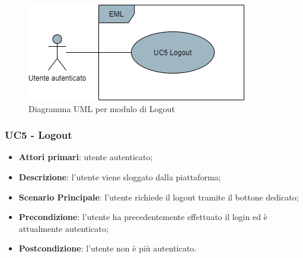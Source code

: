 \begin{figure}[H]
\centering
\includegraphics[scale=0.6]{res/UseCase/Immagini/Logout}
\caption{Diagramma UML per modulo di Logout}
\end{figure}

\subsubsection{UC5 - Logout}
\begin{itemize}
\item \textbf{Attori primari}: utente autenticato;
\item \textbf{Descrizione}: l'utente viene sloggato dalla piattaforma;
\item \textbf{Scenario Principale}: l'utente richiede il logout tramite il bottone dedicato;
\item \textbf{Precondizione}: l'utente ha precedentemente effettuato il login ed è attualmente autenticato;
\item \textbf{Postcondizione}: l'utente non è più autenticato.
\end{itemize}